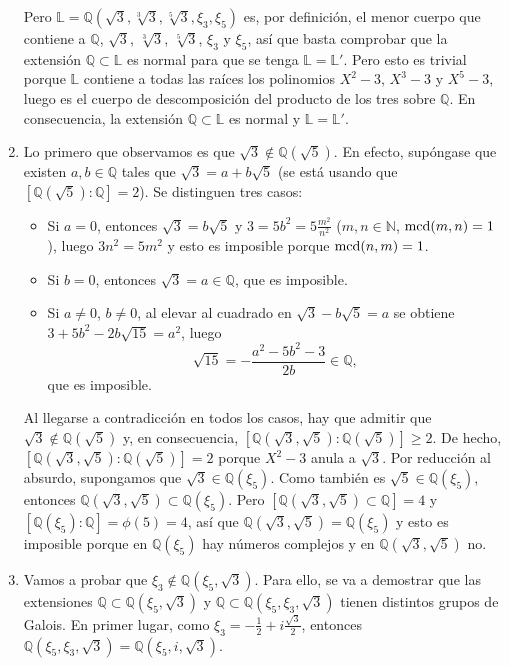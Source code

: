 \documentclass[11pt]{report}
\makeatletter
\renewenvironment{proof}[1][\proofname]{\par
  \pushQED{\qed}%
  \normalfont \topsep\z@skip %
  \trivlist
  \item[\hskip\labelsep
        \itshape
    #1\@addpunct{.}]\ignorespaces
}{%
  \popQED\endtrivlist\@endpefalse
}
\newcommand{\N}{\mathbb N}
\newcommand{\Q}{\mathbb Q}
\renewcommand{\L}{\mathbb L}
\makeatother
\begin{document}
\begin{proof}
\begin{enumerate}
    Pero $\L = \Q(\sqrt{3}, \sqrt[3]{3}, \sqrt[5]{3},\xi_{3},\xi_5)$ es, por definición, el menor cuerpo que contiene a $\Q$, $\sqrt{3}$, $\sqrt[3]{3}$, $\sqrt[5]{3}$, $\xi_{3}$ y $\xi_{5}$, así que basta comprobar que la extensión $\Q \subset \L$ es normal para que se tenga $\L = \L'$. Pero esto es trivial porque $\L$ contiene a todas las raíces los polinomios $X^2-3$, $X^3-3$ y $X^5-3$, luego es el cuerpo de descomposición del producto de los tres sobre $\Q$. En consecuencia, la extensión $\Q \subset \L$ es normal y $\L = \L'$.
    \item Lo primero que observamos es que $\sqrt{3} \not\in \Q(\sqrt{5})$. En efecto, supóngase que existen $a,b \in \Q$ tales que $\sqrt{3} = a+b\sqrt{5}$ (se está usando que $[\Q(\sqrt{5}) \colon \Q] = 2$). Se distinguen tres casos:
    \begin{itemize}
        \item Si $a = 0$, entonces $\sqrt{3}=b\sqrt{5}$ y $3=5b^2 = 5\frac{m^2}{n^2}$ ($m,n \in \N$, $\textup{mcd}(m,n) =1$), luego $3n^2 = 5m^2$ y esto es imposible porque $\textup{mcd}(n,m)=1$.
        \item Si $b=0$, entonces $\sqrt{3} = a \in \Q$, que es imposible.
        \item Si $a\neq 0$, $b \neq 0$, al elevar al cuadrado en $\sqrt{3}-b\sqrt{5}=a$ se obtiene
        $3+5b^2-2b\sqrt{15} = a^2$, luego
        \[\sqrt{15}=-\frac{a^2-5b^2-3}{2b} \in \Q,\]
        que es imposible.
    \end{itemize}
    Al llegarse a contradicción en todos los casos, hay que admitir que $\sqrt{3} \not\in \Q(\sqrt{5})$ y, en consecuencia, $[\Q(\sqrt{3},\sqrt{5}) \colon \Q(\sqrt{5})] \geq 2$. De hecho, $[\Q(\sqrt{3},\sqrt{5}) \colon \Q(\sqrt{5})] = 2$ porque $X^2-3$ anula a $\sqrt{3}$. Por reducción al absurdo, supongamos que $\sqrt{3} \in \Q(\xi_5)$. Como también es $\sqrt{5} \in \Q(\xi_5)$, entonces $\Q(\sqrt{3},\sqrt{5}) \subset \Q(\xi_5)$. Pero $[\Q(\sqrt{3},\sqrt{5}) \subset \Q] = 4$ y $[\Q(\xi_5) \colon \Q] = \phi(5)=4$, así que $\Q(\sqrt{3},\sqrt{5}) = \Q(\xi_5)$ y esto es imposible porque en $\Q(\xi_5)$ hay números complejos y en $\Q(\sqrt{3},\sqrt{5})$ no.
    \item Vamos a probar que $\xi_3 \not\in \Q(\xi_5,\sqrt{3})$. Para ello, se va a demostrar que las extensiones $\Q \subset \Q(\xi_5,\sqrt{3})$ y $\Q \subset \Q(\xi_5,\xi_3,\sqrt{3})$ tienen distintos grupos de Galois. En primer lugar, como $\xi_3 = -\frac{1}{2}+i\frac{\sqrt{3}}{2}$, entonces $\Q(\xi_5,\xi_3,\sqrt{3}) = \Q(\xi_5,i,\sqrt{3})$.
    \begin{itemize}

\end{itemize}
\end{enumerate}
\end{proof}
\end{document}
